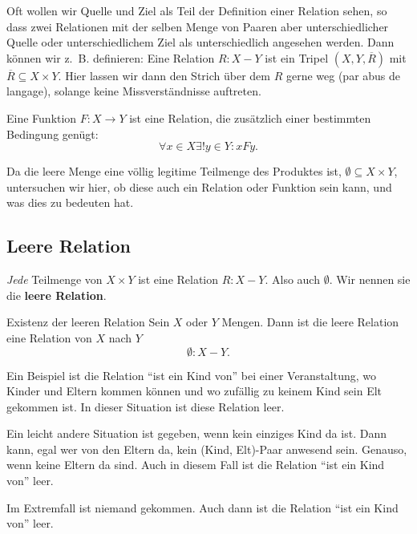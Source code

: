 \documentclass[a4paper]{amsart}
\theoremstyle{definition}
\newcommand{\zb}{z.~B. }
\begin{document}
Oft wollen wir Quelle und Ziel als Teil der Definition einer Relation sehen, so dass zwei Relationen mit der selben Menge von Paaren aber unterschiedlicher Quelle oder unterschiedlichem Ziel als unterschiedlich angesehen werden. Dann können wir \zb definieren: Eine Relation $R \colon X - Y$ ist ein Tripel $(X,Y,\overline R)$ mit $\overline R \subseteq X \times Y$. Hier lassen wir dann den Strich über dem $R$ gerne weg (par abus de langage), solange keine Missverständnisse auftreten. 

Eine Funktion $F \colon X \to Y$ ist eine Relation, die zusätzlich einer bestimmten Bedingung genügt:
\begin{equation}\label{funktion}
   \boxed{\forall x \in X \exists! y \in Y \colon xFy}.
\end{equation}

Da die leere Menge eine völlig legitime Teilmenge des Produktes ist, $\emptyset \subseteq X \times Y$, untersuchen wir hier, ob diese auch ein Relation oder Funktion sein kann, und was dies zu bedeuten hat.

\subsection*{Leere Relation}
\emph{Jede} Teilmenge von $X \times Y$ ist eine Relation $R \colon X - Y$. Also auch $\emptyset$. Wir nennen sie die \textbf{leere Relation}.
\begin{Satz}{Existenz der leeren Relation}
   Sein $X$ oder $Y$ Mengen. Dann ist die leere Relation eine Relation von $X$ nach $Y$
   \begin{equation}
      \emptyset \colon X - Y.
   \end{equation}
\end{Satz}

Ein Beispiel ist die Relation "`ist ein Kind von"' bei einer Veranstaltung, wo Kinder und Eltern kommen können und wo zufällig zu keinem Kind sein Elt gekommen ist. In dieser Situation ist diese Relation leer.

Ein leicht andere Situation ist gegeben, wenn kein einziges Kind da ist. Dann kann, egal wer von den Eltern da, kein (Kind, Elt)-Paar anwesend sein. Genauso, wenn keine Eltern da sind. Auch in diesem Fall ist die Relation "`ist ein Kind von"' leer.

Im Extremfall ist niemand gekommen. Auch dann ist die Relation "`ist ein Kind von"' leer.
\end{document}
